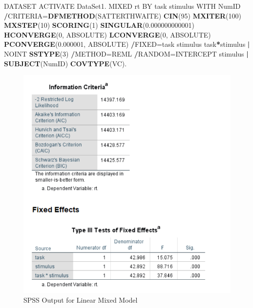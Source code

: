 \documentclass[
]{book}
\newenvironment{Shaded}{\begin{snugshade}}{\end{snugshade}}
\newcommand{\DecValTok}[1]{\textcolor[rgb]{0.00,0.00,0.81}{#1}}
\newcommand{\FloatTok}[1]{\textcolor[rgb]{0.00,0.00,0.81}{#1}}
\newcommand{\KeywordTok}[1]{\textcolor[rgb]{0.13,0.29,0.53}{\textbf{#1}}}
\newcommand{\NormalTok}[1]{#1}
\newcommand{\OperatorTok}[1]{\textcolor[rgb]{0.81,0.36,0.00}{\textbf{#1}}}
\newcommand{\StringTok}[1]{\textcolor[rgb]{0.31,0.60,0.02}{#1}}
\begin{document}
\begin{Shaded}
\begin{Highlighting}[]
\NormalTok{DATASET ACTIVATE DataSet1.}
\NormalTok{MIXED rt BY task stimulus WITH NumID}
  \OperatorTok{/}\NormalTok{CRITERIA=}\KeywordTok{DFMETHOD}\NormalTok{(SATTERTHWAITE) }\KeywordTok{CIN}\NormalTok{(}\DecValTok{95}\NormalTok{) }\KeywordTok{MXITER}\NormalTok{(}\DecValTok{100}\NormalTok{) }\KeywordTok{MXSTEP}\NormalTok{(}\DecValTok{10}\NormalTok{) }\KeywordTok{SCORING}\NormalTok{(}\DecValTok{1}\NormalTok{) }
    \KeywordTok{SINGULAR}\NormalTok{(}\FloatTok{0.000000000001}\NormalTok{) }\KeywordTok{HCONVERGE}\NormalTok{(}\DecValTok{0}\NormalTok{, ABSOLUTE) }\KeywordTok{LCONVERGE}\NormalTok{(}\DecValTok{0}\NormalTok{, ABSOLUTE) }\KeywordTok{PCONVERGE}\NormalTok{(}\FloatTok{0.000001}\NormalTok{, ABSOLUTE)    }
  \OperatorTok{/}\NormalTok{FIXED=task stimulus task}\OperatorTok{*}\NormalTok{stimulus }\OperatorTok{|}\StringTok{ }\NormalTok{NOINT }\KeywordTok{SSTYPE}\NormalTok{(}\DecValTok{3}\NormalTok{)}
  \OperatorTok{/}\NormalTok{METHOD=REML}
  \OperatorTok{/}\NormalTok{RANDOM=INTERCEPT stimulus }\OperatorTok{|}\StringTok{ }\KeywordTok{SUBJECT}\NormalTok{(NumID) }\KeywordTok{COVTYPE}\NormalTok{(VC).}
\end{Highlighting}
\end{Shaded}

\begin{figure}[!h]
\includegraphics{Screenshots/Linear Mixed Model/lmmSPSS} \caption{\label{fig:lmmSPSS}SPSS Output for Linear Mixed Model}\label{fig:lmmSPSS}
\end{figure}
\end{document}
